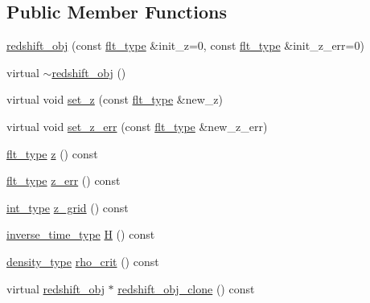\subsection*{Public Member Functions}
\begin{DoxyCompactItemize}
\item 
\hyperlink{classIceBRG_1_1redshift__obj_a6b280539389ede3e7d511934bb4ef46d}{redshift\+\_\+obj} (const \hyperlink{lib_2IceBRG__main_2common_8h_ad0f130a56eeb944d9ef2692ee881ecc4}{flt\+\_\+type} \&init\+\_\+z=0, const \hyperlink{lib_2IceBRG__main_2common_8h_ad0f130a56eeb944d9ef2692ee881ecc4}{flt\+\_\+type} \&init\+\_\+z\+\_\+err=0)
\item 
virtual \hyperlink{classIceBRG_1_1redshift__obj_ae6bc5518532abb0e99b47ba4c722b5e3}{$\sim$redshift\+\_\+obj} ()
\item 
virtual void \hyperlink{classIceBRG_1_1redshift__obj_a0c048c6fd1c2dc08138a6352e424ad05}{set\+\_\+z} (const \hyperlink{lib_2IceBRG__main_2common_8h_ad0f130a56eeb944d9ef2692ee881ecc4}{flt\+\_\+type} \&new\+\_\+z)
\item 
virtual void \hyperlink{classIceBRG_1_1redshift__obj_ad22765859fcc9b5685f5ec86c0c002ca}{set\+\_\+z\+\_\+err} (const \hyperlink{lib_2IceBRG__main_2common_8h_ad0f130a56eeb944d9ef2692ee881ecc4}{flt\+\_\+type} \&new\+\_\+z\+\_\+err)
\item 
\hyperlink{lib_2IceBRG__main_2common_8h_ad0f130a56eeb944d9ef2692ee881ecc4}{flt\+\_\+type} \hyperlink{classIceBRG_1_1redshift__obj_a74692af753d1a101e5d170a1071ac7f4}{z} () const 
\item 
\hyperlink{lib_2IceBRG__main_2common_8h_ad0f130a56eeb944d9ef2692ee881ecc4}{flt\+\_\+type} \hyperlink{classIceBRG_1_1redshift__obj_a1d8b387d6e1f8946074af9aad7142898}{z\+\_\+err} () const 
\item 
\hyperlink{lib_2IceBRG__main_2common_8h_ac4de9d9335536ac22821171deec8d39e}{int\+\_\+type} \hyperlink{classIceBRG_1_1redshift__obj_afae560feff72a1363ed251a3eb117de5}{z\+\_\+grid} () const 
\item 
\hyperlink{namespaceIceBRG_a92c76f9b2ac706653b9b12c36904712c}{inverse\+\_\+time\+\_\+type} \hyperlink{classIceBRG_1_1redshift__obj_aefe5f94139abc4a5e2c8c7f2d4cabbb3}{H} () const 
\item 
\hyperlink{namespaceIceBRG_a9f5e5cdd641bb4c06f7305dfb5ae0238}{density\+\_\+type} \hyperlink{classIceBRG_1_1redshift__obj_ad865923687a27aa4b66e9fe728b0964d}{rho\+\_\+crit} () const 
\item 
virtual \hyperlink{classIceBRG_1_1redshift__obj}{redshift\+\_\+obj} $\ast$ \hyperlink{classIceBRG_1_1redshift__obj_a02f96529ff7f42ae64ae832712930e3b}{redshift\+\_\+obj\+\_\+clone} () const 
\end{DoxyCompactItemize}


